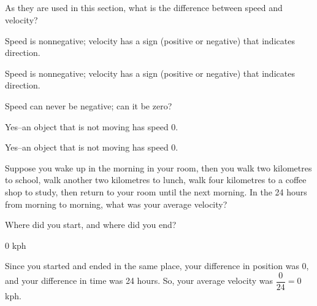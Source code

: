 %
%

\subsection*{\Conceptual}

\begin{question}
As they are used in this section, what is the difference between speed and velocity?
\end{question}
\begin{answer}
Speed is nonnegative; velocity has a sign (positive or negative) that indicates direction.
\end{answer}
\begin{solution}
Speed is nonnegative; velocity has a sign (positive or negative) that indicates direction.
\end{solution}

\begin{question} Speed can never be negative; can it be zero?
\end{question}
\begin{answer}
Yes--an object that is not moving has speed 0.
\end{answer}
\begin{solution}
Yes--an object that is not moving has speed 0.
\end{solution}


\begin{Mquestion}Suppose you wake up in the morning in your room, then you walk two kilometres to school, walk another two kilometres to lunch, walk four kilometres to a coffee shop to study, then return to your room until the next morning. In the 24 hours from morning to morning, what was your average velocity?
\end{Mquestion}
\begin{hint}Where did you start, and where did you end?
\end{hint}
\begin{answer}0 kph
\end{answer}
\begin{solution}Since you started and ended in the same place, your difference in position was 0, and  your difference in time was 24 hours. So, your average velocity was $\dfrac{0}{24}=0$ kph.
\end{solution}



